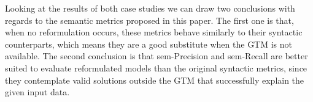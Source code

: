 Looking at the results of both case studies we can draw two conclusions with regards to the semantic metrics proposed in this paper. The first one is that, when no reformulation occurs, these metrics behave similarly to their syntactic counterparts, which means they are a good substitute when the GTM is not available. The second conclusion is that sem-Precision and sem-Recall are better suited to evaluate reformulated models than the original syntactic metrics, since they contemplate valid solutions outside the GTM that successfully explain the given input data. %






